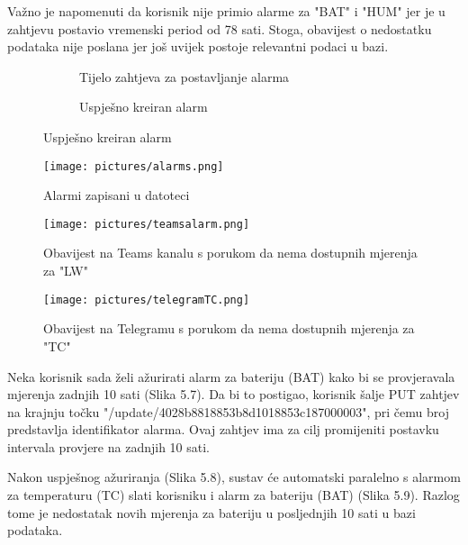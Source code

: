 \documentclass[times, utf8, zavrsni]{fer}
\begin{document}
Važno je napomenuti da korisnik nije primio alarme za "BAT" i "HUM" jer je u zahtjevu postavio vremenski period od 78 sati. Stoga, obavijest o nedostatku podataka nije poslana jer još uvijek postoje relevantni podaci u bazi.

\begin{figure}[h]
\begin{subfigure}
			\texttt{[image: pictures/createB.png]} %
		\centering
			\caption{Tijelo zahtjeva za postavljanje alarma}
			\label{fig:promjene}
     \end{subfigure}
       \begin{subfigure}
			\texttt{[image: pictures/KreiranjeAlarma.png]} %
		\centering
			\caption{Uspješno kreiran alarm}
			\label{fig:promjene}
     \end{subfigure}
     \end{figure}
     \clearpage
     \begin{figure}[h!]
			\texttt{[image: pictures/alarms.png]} %
		\centering
			\caption{Alarmi zapisani u datoteci}
			\label{fig:promjene}
     \end{figure}
          \begin{figure}[h!]
			\texttt{[image: pictures/teamsalarm.png]} %
		\centering
			\caption{Obavijest na Teams kanalu s porukom da nema dostupnih mjerenja za "LW"}
			\label{fig:promjene}
     \end{figure}
      \begin{figure}[h!]
			\texttt{[image: pictures/telegramTC.png]} %
		\centering
			\caption{Obavijest na Telegramu s porukom da nema dostupnih mjerenja za "TC"}
			\label{fig:promjene}
     \end{figure}
     \newpage
         
Neka korisnik sada želi ažurirati alarm za bateriju (BAT) kako bi se provjeravala mjerenja zadnjih 10 sati (Slika 5.7). Da bi to postigao, korisnik šalje PUT zahtjev na krajnju točku "/update/4028b8818853b8d1018853c187000003", pri čemu broj predstavlja identifikator alarma. Ovaj zahtjev ima za cilj promijeniti postavku intervala provjere na zadnjih 10 sati.

Nakon uspješnog ažuriranja (Slika 5.8), sustav će automatski paralelno s alarmom za temperaturu (TC) slati korisniku i alarm za bateriju (BAT) (Slika 5.9). Razlog tome je nedostatak novih mjerenja za bateriju u posljednjih 10 sati u bazi podataka.
\end{document}
